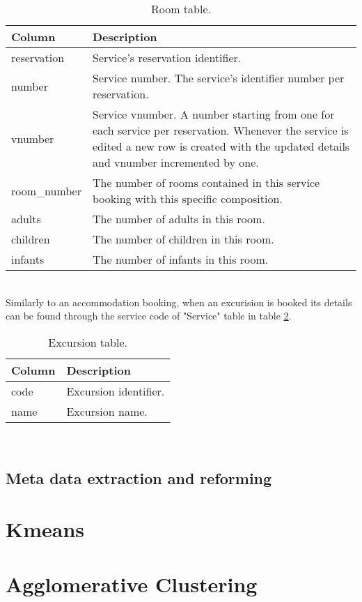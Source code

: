 \begin{table}[h!]
\begin{center}
\begin{tabular}{l | p{12cm}}
\hline\hline
\textbf{Column} & \textbf{Description}\\
\hline\hline
reservation & Service's reservation identifier.\\
\hline
number & Service number. The service's identifier number per reservation.\\
\hline
vnumber & Service vnumber. A number starting from one for each service per reservation. Whenever the service is edited a new row is created with the updated details and vnumber incremented by one.\\
\hline
room\_number & The number of rooms contained in this service booking with this specific composition.\\
\hline
adults & The number of adults in this room.\\
\hline
children & The number of children in this room.\\
\hline
infants & The number of infants in this room.\\
\hline\hline
\end{tabular}
\caption{Room table.}
\label{tab:room}
\end{center}
\end{table}
\\
Similarly to an accommodation booking, when an excurision is booked its details can be found through the service code of "Service" table in table \ref{tab:excursion}. \\
\begin{table}[h!]
\begin{center}
\begin{tabular}{l | p{12cm}}
\hline\hline
\textbf{Column} & \textbf{Description}\\
\hline\hline
code & Excursion identifier.\\
\hline
name & Excursion name.\\
\hline\hline
\end{tabular}
\caption{Excursion table.}
\label{tab:excursion}
\end{center}
\end{table}
\\
\subsection{Meta data extraction and reforming}
\section{Kmeans}
\section{Agglomerative Clustering}
